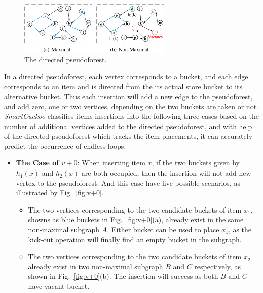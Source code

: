 \documentclass[runningheads]{llncs}
\begin{document}
\begin{figure}
    \centering
    \includegraphics[width=0.65\textwidth]{maximal-graph.png}
    \caption{The directed pseudoforest.} \label{fig:maximal-graph}
\end{figure}

In a directed pseudoforest, each vertex corresponds to a bucket, and each edge corresponds to an item and is directed from the its actual store bucket to its alternative bucket. Thus each insertion will add a new edge to the pseudoforest, and add zero, one or two vertices, depending on the two buckets are taken or not.  \textit{SmartCuckoo} classifies items insertions into the following three cases based on the number of additional vertices added to the directed pseudoforest, and with help of the directed pseudoforest which tracks the item placements, it can accurately predict the occurrence of endless loops.

\begin{itemize}
    \item \textbf{The Case of $v+0$}: When inserting item $x$, if the two buckets given by $h_1(x)$ and $h_2(x)$ are both occupied, then the insertion will not add new vertex to the pseudoforest. And this case have five possible scenarios, as illustrated by Fig.~\ref{fig:v+0}.
    \begin{itemize}
        \item The two vertices corresponding to the two candidate buckets of item $x_1$, showns as blue buckets in Fig.~\ref{fig:v+0}(a), already exist in the same non-maximal subgraph $A$. Either bucket can be used to place $x_1$, as the kick-out operation will finally find an empty bucket in the subgraph.
        \item The two vertices corresponding to the two candidate buckets of item $x_2$ already exist in two non-maximal subgraph $B$ and $C$ respectively, as shown in Fig.~\ref{fig:v+0}(b). The insertion will success as both $B$ and $C$ have vacant bucket.
    \end{itemize}
\end{itemize}
\end{document}

